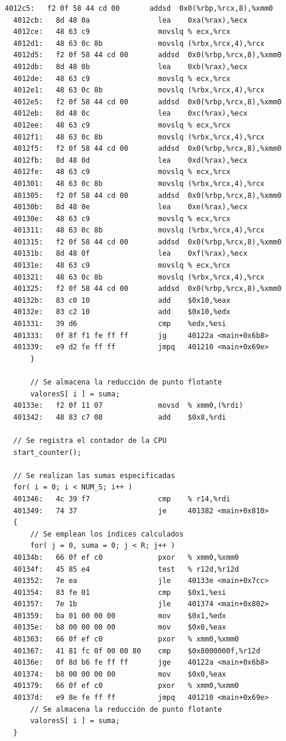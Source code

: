 \documentclass[conference]{IEEEtran}
\begin{document}
\begin{lstlisting}[style=customasm, basicstyle=\scriptsize, title=Traducción a ensamblador del bucle computacional del programa de pruebas incluyendo la precarga mediante software.]
  4012c5:	f2 0f 58 44 cd 00    	addsd  0x0(%rbp,%rcx,8),%xmm0
  4012cb:	8d 48 0a             	lea    0xa(%rax),%ecx
  4012ce:	48 63 c9             	movslq % ecx,%rcx
  4012d1:	48 63 0c 8b          	movslq (%rbx,%rcx,4),%rcx
  4012d5:	f2 0f 58 44 cd 00    	addsd  0x0(%rbp,%rcx,8),%xmm0
  4012db:	8d 48 0b             	lea    0xb(%rax),%ecx
  4012de:	48 63 c9             	movslq % ecx,%rcx
  4012e1:	48 63 0c 8b          	movslq (%rbx,%rcx,4),%rcx
  4012e5:	f2 0f 58 44 cd 00    	addsd  0x0(%rbp,%rcx,8),%xmm0
  4012eb:	8d 48 0c             	lea    0xc(%rax),%ecx
  4012ee:	48 63 c9             	movslq % ecx,%rcx
  4012f1:	48 63 0c 8b          	movslq (%rbx,%rcx,4),%rcx
  4012f5:	f2 0f 58 44 cd 00    	addsd  0x0(%rbp,%rcx,8),%xmm0
  4012fb:	8d 48 0d             	lea    0xd(%rax),%ecx
  4012fe:	48 63 c9             	movslq % ecx,%rcx
  401301:	48 63 0c 8b          	movslq (%rbx,%rcx,4),%rcx
  401305:	f2 0f 58 44 cd 00    	addsd  0x0(%rbp,%rcx,8),%xmm0
  40130b:	8d 48 0e             	lea    0xe(%rax),%ecx
  40130e:	48 63 c9             	movslq % ecx,%rcx
  401311:	48 63 0c 8b          	movslq (%rbx,%rcx,4),%rcx
  401315:	f2 0f 58 44 cd 00    	addsd  0x0(%rbp,%rcx,8),%xmm0
  40131b:	8d 48 0f             	lea    0xf(%rax),%ecx
  40131e:	48 63 c9             	movslq % ecx,%rcx
  401321:	48 63 0c 8b          	movslq (%rbx,%rcx,4),%rcx
  401325:	f2 0f 58 44 cd 00    	addsd  0x0(%rbp,%rcx,8),%xmm0
  40132b:	83 c0 10             	add    $0x10,%eax
  40132e:	83 c2 10             	add    $0x10,%edx
  401331:	39 d6                	cmp    %edx,%esi
  401333:	0f 8f f1 fe ff ff    	jg     40122a <main+0x6b8>
  401339:	e9 d2 fe ff ff       	jmpq   401210 <main+0x69e>
      }

      // Se almacena la reducción de punto flotante
      valoresS[ i ] = suma;
  40133e:	f2 0f 11 07          	movsd  % xmm0,(%rdi)
  401342:	48 83 c7 08          	add    $0x8,%rdi

  // Se registra el contador de la CPU
  start_counter();

  // Se realizan las sumas especificadas
  for( i = 0; i < NUM_S; i++ )
  401346:	4c 39 f7             	cmp    % r14,%rdi
  401349:	74 37                	je     401382 <main+0x810>
  {
      // Se emplean los índices calculados
      for( j = 0, suma = 0; j < R; j++ )
  40134b:	66 0f ef c0          	pxor   % xmm0,%xmm0
  40134f:	45 85 e4             	test   % r12d,%r12d
  401352:	7e ea                	jle    40133e <main+0x7cc>
  401354:	83 fe 01             	cmp    $0x1,%esi
  401357:	7e 1b                	jle    401374 <main+0x802>
  401359:	ba 01 00 00 00       	mov    $0x1,%edx
  40135e:	b8 00 00 00 00       	mov    $0x0,%eax
  401363:	66 0f ef c0          	pxor   % xmm0,%xmm0
  401367:	41 81 fc 0f 00 00 80 	cmp    $0x8000000f,%r12d
  40136e:	0f 8d b6 fe ff ff    	jge    40122a <main+0x6b8>
  401374:	b8 00 00 00 00       	mov    $0x0,%eax
  401379:	66 0f ef c0          	pxor   % xmm0,%xmm0
  40137d:	e9 8e fe ff ff       	jmpq   401210 <main+0x69e>
      // Se almacena la reducción de punto flotante
      valoresS[ i ] = suma;
  }


\end{lstlisting}
\end{document}
